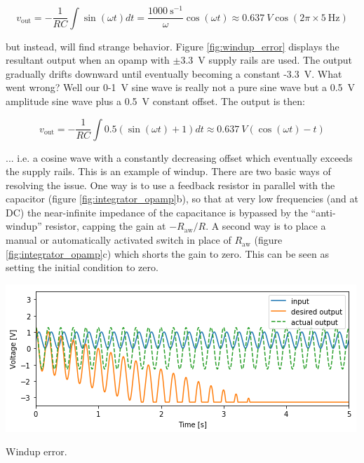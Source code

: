 \documentclass{tufte-book}
\begin{document}
$$
v_\text{out} = -\frac{1}{RC}\int\sin(\omega t)dt = \frac{1000~\text{s}^{-1}}{\omega}\cos(\omega t) \approx 0.637~V\cos(2\pi\times5~\text{Hz})
$$

\noindent but instead, will find strange behavior. Figure \ref{fig:windup_error} displays the resultant output when an opamp with $\pm3.3$~V supply rails are used. The output gradually drifts downward until eventually becoming a constant -3.3~V. What went wrong? Well our 0-1~V sine wave is really not a pure sine wave but a 0.5~V amplitude sine wave plus a 0.5~V constant offset. The output is then:

$$
v_\text{out} = -\frac{1}{RC}\int0.5\left(\sin(\omega t) + 1\right)dt \approx 0.637~V\left(\cos(\omega t) - t\right)
$$

\noindent ... i.e. a cosine wave with a constantly decreasing offset which eventually exceeds the supply rails. This is an example of windup. There are two basic ways of resolving the issue. One way is to use a feedback resistor in parallel with the capacitor (figure \ref{fig:integrator_opamp}b), so that at very low frequencies (and at DC) the near-infinite impedance of the capacitance is bypassed by the ``anti-windup'' resistor, capping the gain at $-R_\text{aw}/R$. A second way is to place a manual or automatically activated switch in place of $R_\text{aw}$ (figure \ref{fig:integrator_opamp}c) which shorts the gain to zero. This can be seen as setting the initial condition to zero.

\begin{marginfigure}%
  \includegraphics[width=\linewidth]{windup_error}
  \caption{Windup error.}
  \label{fig:windup_error}
\end{marginfigure}


\backmatter

% 
% 


\printindex
\end{document}
